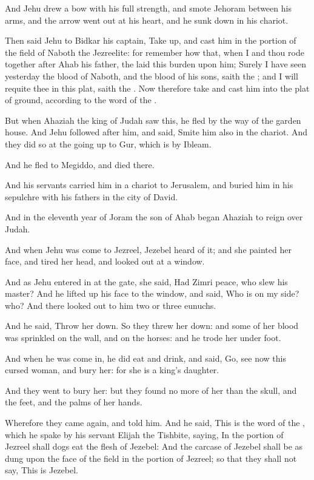 \Verse And Jehu drew a bow with his full strength, and smote Jehoram between his arms, and the arrow went out at his heart, and he sunk down in his chariot.

\Verse Then said Jehu to Bidkar his captain, Take up, and cast him in the portion of the field of Naboth the Jezreelite: for remember how that, when I and thou rode together after Ahab his father, the \LORD laid this burden upon him; \Verse Surely I have seen yesterday the blood of Naboth, and the blood of his sons, saith the \LORD; and I will requite thee in this plat, saith the \LORD. Now therefore take and cast him into the plat of ground, according to the word of the \LORD.

\Verse But when Ahaziah the king of Judah saw this, he fled by the way of the garden house. And Jehu followed after him, and said, Smite him also in the chariot. And they did so at the going up to Gur, which is by Ibleam.

And he fled to Megiddo, and died there.

\Verse And his servants carried him in a chariot to Jerusalem, and buried him in his sepulchre with his fathers in the city of David.

\Verse And in the eleventh year of Joram the son of Ahab began Ahaziah to reign over Judah.

\Verse And when Jehu was come to Jezreel, Jezebel heard of it; and she painted her face, and tired her head, and looked out at a window.

\Verse And as Jehu entered in at the gate, she said, Had Zimri peace, who slew his master?  \Verse And he lifted up his face to the window, and said, Who is on my side?  who? And there looked out to him two or three eunuchs.

\Verse And he said, Throw her down. So they threw her down: and some of her blood was sprinkled on the wall, and on the horses: and he trode her under foot.

\Verse And when he was come in, he did eat and drink, and said, Go, see now this cursed woman, and bury her: for she is a king's daughter.

\Verse And they went to bury her: but they found no more of her than the skull, and the feet, and the palms of her hands.

\Verse Wherefore they came again, and told him. And he said, This is the word of the \LORD, which he spake by his servant Elijah the Tishbite, saying, In the portion of Jezreel shall dogs eat the flesh of Jezebel: \Verse And the carcase of Jezebel shall be as dung upon the face of the field in the portion of Jezreel; so that they shall not say, This is Jezebel.



